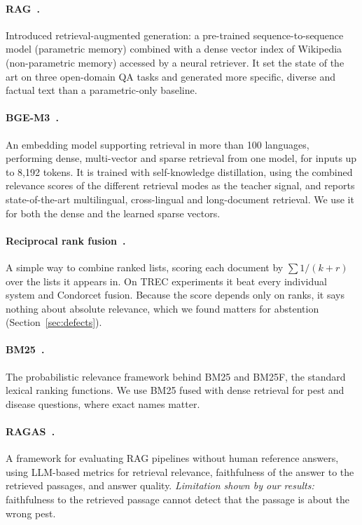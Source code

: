 \paragraph{RAG~\cite{lewis2020rag}.}
Introduced retrieval-augmented generation: a pre-trained sequence-to-sequence model
(parametric memory) combined with a dense vector index of Wikipedia (non-parametric memory)
accessed by a neural retriever. It set the state of the art on three open-domain QA tasks and
generated more specific, diverse and factual text than a parametric-only baseline.

\paragraph{BGE-M3~\cite{chen2024bgem3}.}
An embedding model supporting retrieval in more than 100 languages, performing dense,
multi-vector and sparse retrieval from one model, for inputs up to 8,192 tokens. It is trained
with self-knowledge distillation, using the combined relevance scores of the different
retrieval modes as the teacher signal, and reports state-of-the-art multilingual,
cross-lingual and long-document retrieval. We use it for both the dense and the learned
sparse vectors.

\paragraph{Reciprocal rank fusion~\cite{cormack2009rrf}.}
A simple way to combine ranked lists, scoring each document by $\sum 1/(k+r)$ over the lists
it appears in. On TREC experiments it beat every individual system and Condorcet fusion.
Because the score depends only on ranks, it says nothing about absolute relevance, which we
found matters for abstention (Section~\ref{sec:defects}).

\paragraph{BM25~\cite{robertson2009bm25}.}
The probabilistic relevance framework behind BM25 and BM25F, the standard lexical ranking
functions. We use BM25 fused with dense retrieval for pest and disease questions, where exact
names matter.

\paragraph{RAGAS~\cite{es2023ragas}.}
A framework for evaluating RAG pipelines without human reference answers, using LLM-based
metrics for retrieval relevance, faithfulness of the answer to the retrieved passages, and
answer quality. \emph{Limitation shown by our results:} faithfulness to the retrieved passage
cannot detect that the passage is about the wrong pest.

